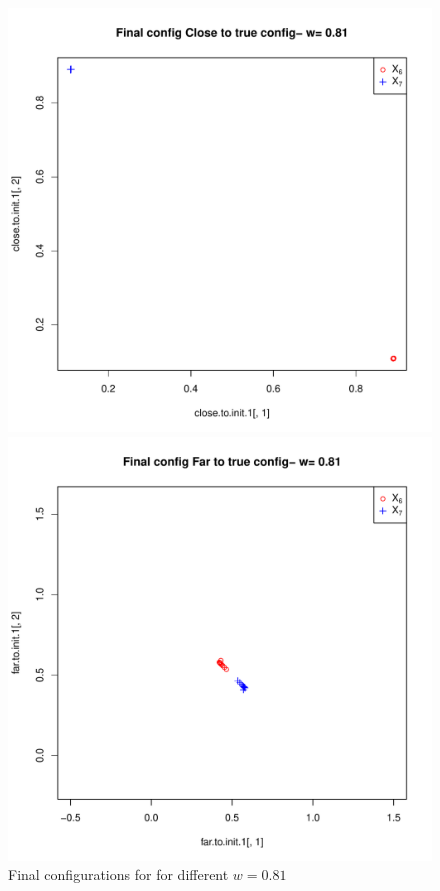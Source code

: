 \documentclass[12pt,oneside,final]{thesis}\usepackage[]{graphicx}\usepackage[]{color}
\begin{document}
\begin{figure}
\begin{minipage}[b]{0.5\linewidth}
\centering
\includegraphics[scale=0.45]{true-min-w0_81.pdf}


\end{minipage}
\hspace{0.5cm}
\begin{minipage}[b]{0.5\linewidth}
\centering
\includegraphics[scale=0.45]{other-min-w0_81.pdf}


\end{minipage}

\caption{Final configurations for for different $w=0.81$ }
\label{fig:Finalconfig-MultMin-w-0_81}

\end{figure}
\end{document}
